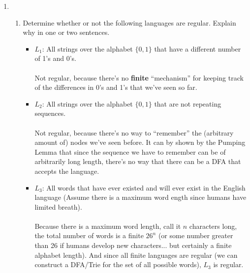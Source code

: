 \begin{enumerate}
        \item 
        \begin{enumerate}
          \item Determine whether or not the following languages are regular. Explain why in one or two sentences.
            \begin{itemize}
              \item $L_1$: All strings over the alphabet $\{0,1\}$ that have a different number of 1's and 0's.\\\\
                Not regular, because there's no \textbf{finite} ``mechanism'' for keeping track of the differences in 0's and 1's that we've seen so far.\\
              \item $L_2$: All strings over the alphabet $\{0,1\}$ that are not repeating sequences.\\\\
                Not regular, because there's no way to ``remember'' the (arbitrary amount of) nodes we've seen before. It can by shown by the Pumping Lemma that since the sequence we have to remember can be of arbitrarily long length, there's no way that there can be a DFA that accepts the language.\\

              \item $L_3$: All words that have ever existed and will ever exist in the English language (Assume there is a maximum word ength since humans have limited breath).\\\\
                Because there is a maximum word length, call it $n$ characters long, the total number of words is a finite $26^{n}$ (or some number greater than 26 if humans develop new characters... but certainly a finite alphabet length). And since all finite languages are regular (we can construct a DFA/Trie for the set of all possible words), $L_3$ is regular.
            \end{itemize}
        \end{enumerate}
\end{enumerate}


